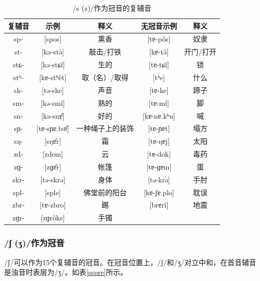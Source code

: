 \begin{table}[H]
\vspace{5pt}
    \centering
    \caption{/s (z)/作为冠音的复辅音}
    \label{spre}
\begin{tabular}{c|cccc}
     \toprule
复辅音   & 示例              & 释义   & 无冠音示例          & 释义        \\
     \midrule
	sp-  & {[}spos{]}        & 熏香       & {[}tɐ-pôs{]}   & 奴隶    \\
st-  & {[}ka-stə̂{]}     & 敲击/打铁    & {[}kɐ-tə̂{]}    & 开门/打开 \\
stɕ- & {[}kə-stɕî{]}    & 生的       & {[}tɐ-tɕî{]}   & 锁     \\
stʰ- & {[}kɐ-stʰêt{]}   & 取（名）/取得  & {[}tʰe{]}       & 什么    \\
sk-  & {[}tə-ske{]}      & 声音       & {[}tɐ-ke{]}     & 蹄子    \\
sm-  & {[}kə-smî{]}     & 熟的       & {[}tɐ-mî{]}    & 脚     \\
sn-  & {[}kə-snɐ̂{]}     & 好的       & {[}kɐ-nɐ.kʰu{]} & 喊     \\
sɲ-  & {[}tɐ-sɲɐ.tsɐ̂{]} & 一种绳子上的装饰 & {[}tɐ-ɲɐt{]}    & 塌方    \\
sŋ-  & {[}sŋɐ̂r{]}       & 霜        & {[}tɐ-ŋɐj{]}    & 太阳    \\
zd-  & {[}zdem{]}        & 云        & {[}tɐ-dok{]}    & 毒药    \\
zɡ-  & {[}zɡɐ̂r{]}       & 帐篷       & {[}tɐ-ɡɐm{]}    & 蛋    \\ 
skr- & {[}tə-skrə{]}   & 身体     & {[}tə-krə{]}    & 手肘    \\
spl- & {[}sple{]}      & 佛堂前的阳台 & {[}kɐ-ʃɐ.plo{]} & 耽误    \\
zbr- & {[}tɐ-zbro{]}   & 踢      & {[}brɐrî{]}    & 地震    \\
zɡr- & {[}zɡrôks{]}   & 手镯     &                 &       \\
   \bottomrule
\end{tabular}
\end{table}

\subsubsection{/ʃ (ʒ)/作为冠音}

/ʃ/可以作为15个复辅音的冠音。在冠音位置上，/ʃ/和/ʒ/对立中和，在首音辅音是浊音时表层为/ʒ/。如表\ref{sspre}所示。

